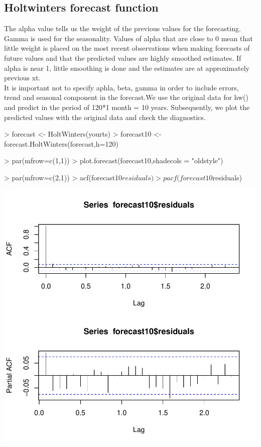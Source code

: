 \documentclass[10pt, a4paper]{article} %
\begin{document}
\subsection{Holtwinters forecast function}
The alpha value tells us the weight of the previous values for the forecasting. Gamma is used for the seasonality. Values of alpha that are close to 0 mean that little weight is placed on the most recent observations when making forecasts of future values and that the predicted values are highly smoothed estimates. If alpha is near 1, little smoothing is done and the estimates are at approximately previous xt. \\

It is important not to specify aphla, beta, gamma in order to include errors, trend and seasonal component in the forecast.We use the original data for hw() and predict in the period of 120*1 month = 10 years. Subsequently, we plot the predicted values with the original data and check the diagnostics.  \\
\begin{Schunk}
\begin{Sinput}
> forecast <- HoltWinters(yourts)
> forecast10 <- forecast.HoltWinters(forecast,h=120)
\end{Sinput}
\end{Schunk}

\begin{Schunk}
\begin{Sinput}
> par(mfrow=c(1,1))
> plot.forecast(forecast10,shadecols = "oldstyle")
\end{Sinput}
\end{Schunk}


\begin{Schunk}
\begin{Sinput}
> par(mfrow=c(2,1))
> acf(forecast10$residuals)
> pacf(forecast10$residuals)
\end{Sinput}
\end{Schunk}
\includegraphics{FINAL_VERSION-070}
\end{document}
